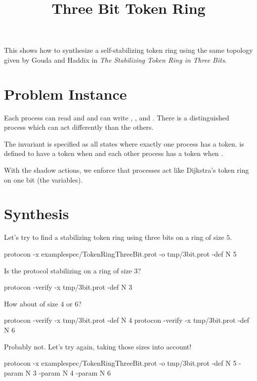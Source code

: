 
\title{Three Bit Token Ring}
\date{}



This shows how to synthesize a self-stabilizing token ring using the same topology given by
Gouda and Haddix in \textit{The Stabilizing Token Ring in Three Bits}.

\section{Problem Instance}


Each process can read  and  and can write , , and .
There is a distinguished process  which can act differently than the others.

The invariant is specified as all states where exactly one process has a token.
 is defined to have a token when  and each other  process has a token when .

With the shadow actions, we enforce that processes act like Dijkstra's token ring on one bit (the  variables).

\section{Synthesis}

Let's try to find a stabilizing token ring using three bits on a ring of size $5$.
\begin{code}
protocon -x examplespec/TokenRingThreeBit.prot -o tmp/3bit.prot -def N 5
\end{code}

Is the protocol stabilizing on a ring of size $3$?
\begin{code}
protocon -verify -x tmp/3bit.prot -def N 3
\end{code}

How about of size $4$ or $6$?
\begin{code}
protocon -verify -x tmp/3bit.prot -def N 4
protocon -verify -x tmp/3bit.prot -def N 6
\end{code}

Probably not.
Let's try again, taking those sizes into account!
\begin{code}
protocon -x examplespec/TokenRingThreeBit.prot -o tmp/3bit.prot -def N 5 -param N 3 -param N 4 -param N 6
\end{code}

